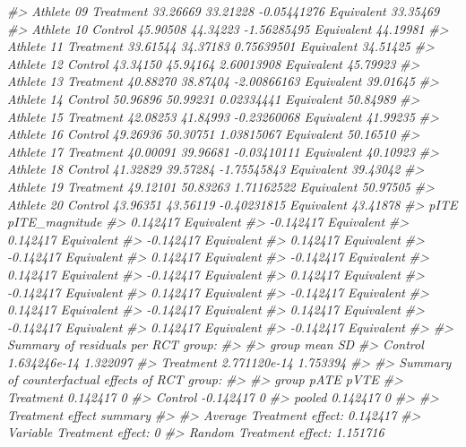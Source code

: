 \documentclass[
]{book}
\newenvironment{Shaded}{\begin{snugshade}}{\end{snugshade}}
\newcommand{\CommentTok}[1]{\textcolor[rgb]{0.56,0.35,0.01}{\textit{#1}}}
\begin{document}
\begin{Shaded}
\begin{Highlighting}[]
\CommentTok{\#>  Athlete 09 Treatment 33.26669  33.21228 {-}0.05441276 Equivalent       33.35469}
\CommentTok{\#>  Athlete 10   Control 45.90508  44.34223 {-}1.56285495 Equivalent       44.19981}
\CommentTok{\#>  Athlete 11 Treatment 33.61544  34.37183  0.75639501 Equivalent       34.51425}
\CommentTok{\#>  Athlete 12   Control 43.34150  45.94164  2.60013908 Equivalent       45.79923}
\CommentTok{\#>  Athlete 13 Treatment 40.88270  38.87404 {-}2.00866163 Equivalent       39.01645}
\CommentTok{\#>  Athlete 14   Control 50.96896  50.99231  0.02334441 Equivalent       50.84989}
\CommentTok{\#>  Athlete 15 Treatment 42.08253  41.84993 {-}0.23260068 Equivalent       41.99235}
\CommentTok{\#>  Athlete 16   Control 49.26936  50.30751  1.03815067 Equivalent       50.16510}
\CommentTok{\#>  Athlete 17 Treatment 40.00091  39.96681 {-}0.03410111 Equivalent       40.10923}
\CommentTok{\#>  Athlete 18   Control 41.32829  39.57284 {-}1.75545843 Equivalent       39.43042}
\CommentTok{\#>  Athlete 19 Treatment 49.12101  50.83263  1.71162522 Equivalent       50.97505}
\CommentTok{\#>  Athlete 20   Control 43.96351  43.56119 {-}0.40231815 Equivalent       43.41878}
\CommentTok{\#>       pITE pITE\_magnitude}
\CommentTok{\#>   0.142417     Equivalent}
\CommentTok{\#>  {-}0.142417     Equivalent}
\CommentTok{\#>   0.142417     Equivalent}
\CommentTok{\#>  {-}0.142417     Equivalent}
\CommentTok{\#>   0.142417     Equivalent}
\CommentTok{\#>  {-}0.142417     Equivalent}
\CommentTok{\#>   0.142417     Equivalent}
\CommentTok{\#>  {-}0.142417     Equivalent}
\CommentTok{\#>   0.142417     Equivalent}
\CommentTok{\#>  {-}0.142417     Equivalent}
\CommentTok{\#>   0.142417     Equivalent}
\CommentTok{\#>  {-}0.142417     Equivalent}
\CommentTok{\#>   0.142417     Equivalent}
\CommentTok{\#>  {-}0.142417     Equivalent}
\CommentTok{\#>   0.142417     Equivalent}
\CommentTok{\#>  {-}0.142417     Equivalent}
\CommentTok{\#>   0.142417     Equivalent}
\CommentTok{\#>  {-}0.142417     Equivalent}
\CommentTok{\#>   0.142417     Equivalent}
\CommentTok{\#>  {-}0.142417     Equivalent}
\CommentTok{\#> }
\CommentTok{\#> Summary of residuals per RCT group:}
\CommentTok{\#> }
\CommentTok{\#>      group         mean       SD}
\CommentTok{\#>    Control 1.634246e{-}14 1.322097}
\CommentTok{\#>  Treatment 2.771120e{-}14 1.753394}
\CommentTok{\#> }
\CommentTok{\#> Summary of counterfactual effects of RCT group:}
\CommentTok{\#> }
\CommentTok{\#>      group      pATE pVTE}
\CommentTok{\#>  Treatment  0.142417    0}
\CommentTok{\#>    Control {-}0.142417    0}
\CommentTok{\#>     pooled  0.142417    0}
\CommentTok{\#> }
\CommentTok{\#> Treatment effect summary}
\CommentTok{\#> }
\CommentTok{\#> Average Treatment effect:  0.142417}
\CommentTok{\#> Variable Treatment effect:  0}
\CommentTok{\#> Random Treatment effect:  1.151716}
\end{Highlighting}
\end{Shaded}
\end{document}
